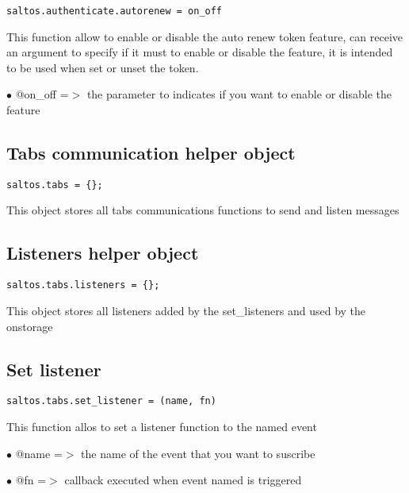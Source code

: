 \documentclass[a4paper]{book}
\begin{document}
\begin{lstlisting}
saltos.authenticate.autorenew = on_off
\end{lstlisting}

This function allow to enable or disable the auto renew token feature, can receive
an argument to specify if it must to enable or disable the feature, it is intended
to be used when set or unset the token.

\begin{compactitem}
\item[\color{myblue}$\bullet$] @on\_off =$>$ the parameter to indicates if you want to enable or disable the feature
\end{compactitem}

\hypertarget{toc420}{}
\subsection{Tabs communication helper object}

\begin{lstlisting}
saltos.tabs = {};
\end{lstlisting}

This object stores all tabs communications functions to send and listen messages

\hypertarget{toc421}{}
\subsection{Listeners helper object}

\begin{lstlisting}
saltos.tabs.listeners = {};
\end{lstlisting}

This object stores all listeners added by the set\_listeners and used by the onstorage

\hypertarget{toc422}{}
\subsection{Set listener}

\begin{lstlisting}
saltos.tabs.set_listener = (name, fn)
\end{lstlisting}

This function allos to set a listener function to the named event

\begin{compactitem}
\item[\color{myblue}$\bullet$] @name =$>$ the name of the event that you want to suscribe
\item[\color{myblue}$\bullet$] @fn   =$>$ callback executed when event named is triggered
\end{compactitem}
\end{document}
